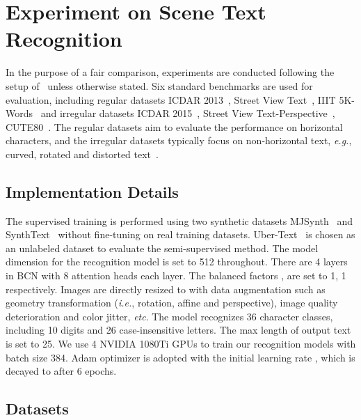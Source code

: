\documentclass[10pt,journal,compsoc]{IEEEtran}
\def\ie{{\it i.e.}\xspace}
\def\eg{{\it e.g.}\xspace}
\def\etc{{\it etc}\xspace}
\begin{document}
\section{Experiment on Scene Text Recognition}
\label{sec:exp}

In the purpose of a fair comparison, experiments are conducted following the setup of~\cite{yu2020towards} unless otherwise stated. Six standard benchmarks are used for evaluation, including regular datasets ICDAR 2013~\cite{karatzas2013icdar}, Street View Text~\cite{wang2011end}, IIIT 5K-Words~\cite{mishra2012scene} and irregular datasets ICDAR 2015~\cite{karatzas2015icdar}, Street View Text-Perspective~\cite{quy2013recognizing}, CUTE80~\cite{risnumawan2014robust}. The regular datasets aim to evaluate the performance on horizontal characters, and the irregular datasets typically focus on non-horizontal text, \eg, curved, rotated and distorted text~\cite{baek2019wrong}.

\subsection{Implementation Details}

The supervised training is performed using two synthetic datasets MJSynth~\cite{jaderberg2014synthetic,jaderberg2016reading} and SynthText~\cite{gupta2016synthetic} without fine-tuning on real training datasets. Uber-Text~\cite{Ying2017UberText} is chosen as an unlabeled dataset to evaluate the semi-supervised method. The model dimension  for the recognition model is set to 512 throughout. There are 4 layers in BCN with 8 attention heads each layer. The balanced factors ,  are set to 1, 1 respectively. Images are directly resized to  with data augmentation such as geometry transformation (\ie, rotation, affine and perspective), image quality deterioration and color jitter, \etc. The model recognizes 36 character classes, including 10 digits and 26 case-insensitive letters. The max length of output text is set to 25. We use 4 NVIDIA 1080Ti GPUs to train our recognition models with batch size 384. Adam optimizer is adopted with the initial learning rate , which is decayed to  after 6 epochs.


\subsection{Datasets}
\end{document}
